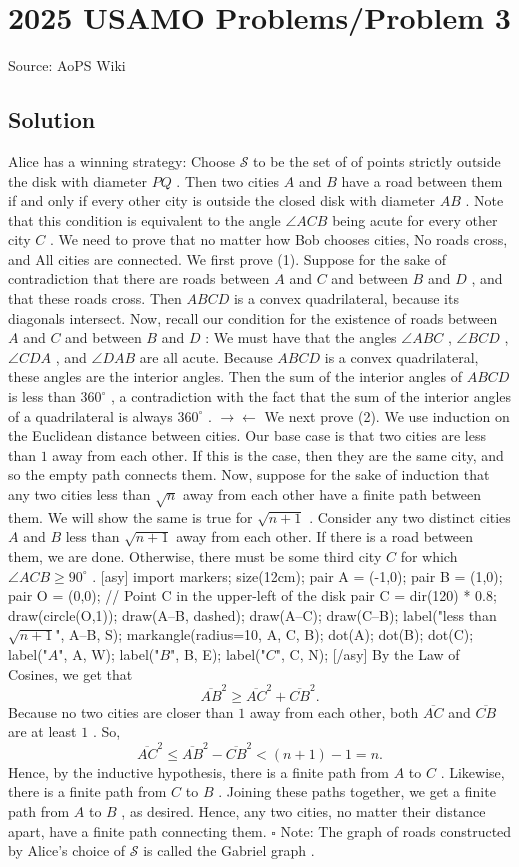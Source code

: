 \documentclass[12pt]{article}
\begin{document}
\section*{{2025 USAMO Problems/Problem 3}}
Source: AoPS Wiki

\subsection*{Solution}
Alice has a winning strategy: Choose $\mathcal S$ to be the set of of points strictly outside the disk with diameter $PQ$ . Then two cities $A$ and $B$ have a road between them if and only if every other city is outside the closed disk with diameter $AB$ . Note that this condition is equivalent to the angle $\angle ACB$ being acute for every other city $C$ . We need to prove that no matter how Bob chooses cities, No roads cross, and All cities are connected. We first prove (1). Suppose for the sake of contradiction that there are roads between $A$ and $C$ and between $B$ and $D$ , and that these roads cross. Then $ABCD$ is a convex quadrilateral, because its diagonals intersect. Now, recall our condition for the existence of roads between $A$ and $C$ and between $B$ and $D$ : We must have that the angles $\angle ABC$ , $\angle BCD$ , $\angle CDA$ , and $\angle DAB$ are all acute. Because $ABCD$ is a convex quadrilateral, these angles are the interior angles. Then the sum of the interior angles of $ABCD$ is less than $360^\circ$ , a contradiction with the fact that the sum of the interior angles of a quadrilateral is always $360^\circ$ . $\rightarrow \leftarrow$ We next prove (2). We use induction on the Euclidean distance between cities. Our base case is that two cities are less than $1$ away from each other. If this is the case, then they are the same city, and so the empty path connects them. Now, suppose for the sake of induction that any two cities less than $\sqrt n$ away from each other have a finite path between them. We will show the same is true for $\sqrt{n + 1}$ . Consider any two distinct cities $A$ and $B$ less than $\sqrt{n + 1}$ away from each other. If there is a road between them, we are done. Otherwise, there must be some third city $C$ for which $\angle ACB \geq 90^\circ$ . [asy] import markers; size(12cm); pair A = (-1,0); pair B = (1,0); pair O = (0,0); // Point C in the upper-left of the disk pair C = dir(120) * 0.8; draw(circle(O,1)); draw(A--B, dashed); draw(A--C); draw(C--B); label("less than $\sqrt{n+1}$", A--B, S); markangle(radius=10, A, C, B); dot(A); dot(B); dot(C); label("$A$", A, W); label("$B$", B, E); label("$C$", C, N); [/asy] By the Law of Cosines, we get that \[\overline{AB}^2 \geq \overline{AC}^2 + \overline{CB}^2.\] Because no two cities are closer than $1$ away from each other, both $\overline{AC}$ and $\overline{CB}$ are at least $1$ . So, \[\overline{AC}^2 \leq \overline{AB}^2 - \overline{CB}^2 < (n + 1) - 1 = n.\] Hence, by the inductive hypothesis, there is a finite path from $A$ to $C$ . Likewise, there is a finite path from $C$ to $B$ . Joining these paths together, we get a finite path from $A$ to $B$ , as desired. Hence, any two cities, no matter their distance apart, have a finite path connecting them. $\square$ Note: The graph of roads constructed by Alice's choice of $\mathcal S$ is called the Gabriel graph .
\end{document}
